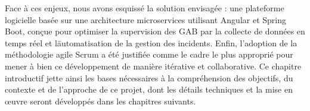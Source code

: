 \documentclass[a4paper,15pt]{report}
\begin{document}
	Face à ces enjeux, nous avons esquissé la solution envisagée : une plateforme logicielle basée sur une architecture microservices utilisant Angular et Spring Boot, conçue pour optimiser la supervision des GAB par la collecte de données en temps réel et l\"automatisation de la gestion des incidents. Enfin, l'adoption de la méthodologie agile Scrum a été justifiée comme le cadre le plus approprié pour mener à bien ce développement de manière itérative et collaborative. Ce chapitre introductif jette ainsi les bases nécessaires à la compréhension des objectifs, du contexte et de l'approche de ce projet, dont les détails techniques et la mise en œuvre seront développés dans les chapitres suivants.
	
	
\end{document}

